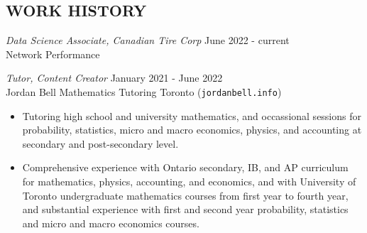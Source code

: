\documentclass[margin, 10pt]{res} %
\begin{document}
\begin{resume}

 



 
\section{WORK HISTORY}

{\sl Data Science Associate, Canadian Tire Corp} \hfill June 2022 - current \\
Network Performance

{\sl Tutor, Content Creator} \hfill January 2021 - June 2022 \\
Jordan Bell Mathematics Tutoring Toronto (\texttt{jordanbell.info})

\begin{itemize} \itemsep -2pt %
\item Tutoring high school and university mathematics, and occassional sessions for
probability, statistics, micro and macro economics, physics, and accounting at secondary and post-secondary level.

\item Comprehensive experience with Ontario secondary, IB, and AP curriculum for mathematics, physics, accounting, and economics, and with University of Toronto undergraduate mathematics courses from first year to fourth year, and substantial experience with first and second year probability, statistics and micro and macro economics courses.
\end{itemize}


\end{resume}
\end{document}
